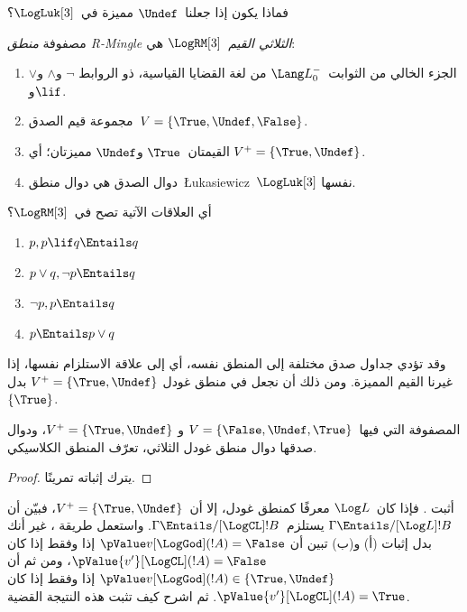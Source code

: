 \documentclass[../../../include/open-logic-section]{subfiles}
\begin{document}
فماذا يكون إذا جعلنا~$\Undef$ مميزة في~$\LogLuk[3]$؟

\begin{defn}
  مصفوفة \emph{منطق R-Mingle الثلاثي القيم}~$\LogRM[3]$ هي:
  \begin{enumerate}
    \item الجزء الخالي من الثوابت~$\Lang L_0^{-}$ من لغة القضايا القياسية، ذو الروابط
    $\lnot$ و$\land$ و$\lor$ و$\lif$.
    \item مجموعة قيم الصدق~$V = \{\True, \Undef, \False\}$.
    \item القيمتان~$\True$ و$\Undef$ مميزتان؛ أي
    $V^+ = \{\True, \Undef\}$.
    \item دوال الصدق هي دوال منطق~\L ukasiewicz~$\LogLuk[3]$ نفسها.
  \end{enumerate}
\end{defn}

\begin{prob}
  أي العلاقات الآتية تصح في~$\LogRM[3]$؟
  \begin{enumerate}
    \item $p, p \lif q \Entails q$
    \item $p \lor q, \lnot p \Entails q$
    \item $\lnot p, p \Entails q$
    \item $p \Entails p \lor q$
  \end{enumerate}
\end{prob}

وقد تؤدي جداول صدق مختلفة إلى المنطق نفسه، أي إلى علاقة الاستلزام
نفسها، إذا غيرنا القيم المميزة. ومن ذلك أن نجعل في منطق غودل
$V^+ = \{\True, \Undef\}$ بدل~$\{\True\}$.

\begin{prop}
  المصفوفة التي فيها~$V = \{\False, \Undef,\True\}$ و
  $V^+=\{\True, \Undef\}$، ودوال صدقها دوال منطق غودل الثلاثي،
  تعرّف المنطق الكلاسيكي.
\end{prop}

\begin{proof}
  يترك إثباته تمرينًا.
\end{proof}

\begin{prob}
  أثبت . فإذا كان~$\Log L$
  معرفًا كمنطق غودل، إلا أن~$V^+=\{\True,\Undef\}$، فبيّن أن
  $\Gamma \Entails/[\Log L] !B$ يستلزم~$\Gamma \Entails/[\LogCL] !B$.
  واستعمل طريقة ، غير أنك بدل
  إثبات (أ) و(ب) تبين أن
  $\pValue v[\LogGod](!A) = \False$ إذا وفقط إذا كان
  $\pValue {v'}[\LogCL](!A) = \False$، ومن ثم أن
  $\pValue v[\LogGod](!A) \in \{\True,\Undef\}$ إذا وفقط إذا كان
  $\pValue {v'}[\LogCL](!A) = \True$. ثم اشرح كيف تثبت هذه النتيجة
  القضية.
\end{prob}
\end{document}
